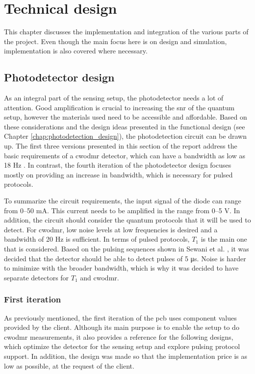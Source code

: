 \chapter{Technical design} \label{chap:tech_design}
This chapter discusses the implementation and integration of the various parts of the project. Even though the main focus here is on design and simulation, implementation is also covered where necessary.
\section{Photodetector design}\label{chap:td:tia_design}
As an integral part of the sensing setup, the photodetector needs a lot of attention. Good amplification is crucial to increasing the \gls{snr} of the quantum setup, however the materials used need to be accessible and affordable. Based on these considerations and the design ideas presented in the functional design (see Chapter \ref{chap:photodetection_design}), the photodetection circuit can be drawn up. The first three versions presented in this section of the report address the basic requirements of a \gls{cwodmr} detector, which can have a bandwidth as low as 18 \unit{\hertz} \cite{acharya2025compact}. In contrast, the fourth iteration of the photodetector design focuses mostly on providing an increase in bandwidth, which is necessary for pulsed protocols.

To summarize the circuit requirements, the input signal of the diode can range from \numrange{0}{50} \unit{\milli\ampere}. This current needs to be amplified in the range from \numrange{0}{5} \unit{\volt}. In addition, the circuit should consider the quantum protocols that it will be used to detect. For \gls{cwodmr}, low noise levels at low frequencies is desired and a bandwidth of 20 \unit{\hertz} is sufficient. In terms of pulsed protocols, $T_1$ is the main one that is considered. Based on the pulsing sequences shown in Sewani et al. \cite{sewani2020coherent}, it was decided that the detector should be able to detect pulses of 5 \unit{\micro\second}. Noise is harder to minimize with the broader bandwidth, which is why it was decided to have separate detectors for $T_1$ and \gls{cwodmr}.

\subsection{First iteration}
As previously mentioned, the first iteration of the \gls{pcb} uses component values provided by the client. Although its main purpose is to enable the setup to do \gls{cwodmr} measurements, it also provides a reference for the following designs, which optimize the detector for the sensing setup and explore pulsing protocol support. In addition, the design was made so that the implementation price is as low as possible, at the request of the client.

